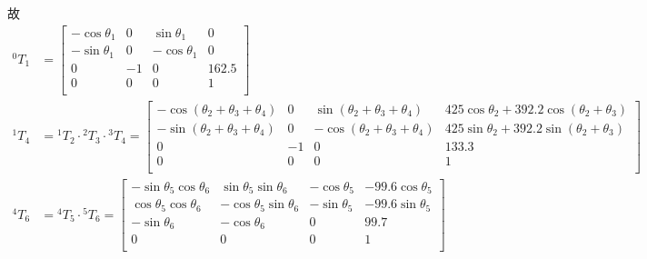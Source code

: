 \documentclass[UTF8, 13pt]{ctexart}
\begin{document}
故
\[
\begin{aligned}
{}^0T_1 &= \begin{bmatrix}
            -\cos\theta_1 & 0 & \sin\theta_1 & 0 \\
            -\sin\theta_1 & 0 & -\cos\theta_1 & 0 \\
            0 & -1 & 0 & 162.5 \\
            0 & 0 & 0 & 1 \\
            \end{bmatrix} \\
{}^1T_4 &= {}^1T_2 \cdot {}^2T_3 \cdot {}^3T_4 = \begin{bmatrix}
            -\cos(\theta_2 + \theta_3 + \theta_4) & 0 & \sin(\theta_2 + \theta_3 + \theta_4) & 425\cos\theta_2 + 392.2\cos(\theta_2 + \theta_3) \\
            -\sin(\theta_2 + \theta_3 + \theta_4) & 0 & -\cos(\theta_2 + \theta_3 + \theta_4) & 425\sin\theta_2 + 392.2\sin(\theta_2 + \theta_3) \\
            0 & -1 & 0 & 133.3 \\
            0 & 0 & 0 & 1 \\
            \end{bmatrix} \\
{}^4T_6 &= {}^4T_5 \cdot {}^5T_6 = \begin{bmatrix}
            -\sin\theta_5\cos\theta_6 & \sin\theta_5\sin\theta_6 & -\cos\theta_5 & -99.6\cos\theta_5 \\
            \cos\theta_5\cos\theta_6 & -\cos\theta_5\sin\theta_6 & -\sin\theta_5 & -99.6\sin\theta_5 \\
            -\sin\theta_6 & -\cos\theta_6 & 0 & 99.7 \\
            0 & 0 & 0 & 1 \\
            \end{bmatrix} \\
\end{aligned}
\]
\vspace{1em}
\end{document}
